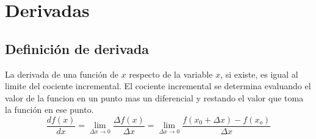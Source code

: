 \chapter{Derivadas}
\section{Definici\'on de derivada}
La derivada de una funci\'on de $x$ respecto de la variable $x$, si existe,  es igual al limite del cociente incremental. El cociente incremental se determina evaluando el valor de la funcion en un punto mas un diferencial y restando el valor que toma la funci\'on en ese punto.
\begin{equation*}
	\frac{df(x)}{dx}=\lim_{\Delta x \rightarrow 0}\frac{\Delta f(x)}{\Delta x}=\lim_{\Delta x \rightarrow 0}\frac{f(x_0 +\Delta x)-f(x_o)}{\Delta x}
\end{equation*}
